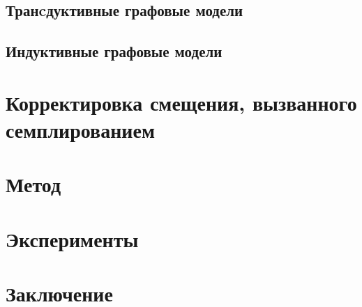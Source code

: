 \documentclass{article}
\begin{document}
\subsection{Транcдуктивные графовые модели}

\subsection{Индуктивные графовые модели}

\section{Корректировка смещения, вызванного семплированием}

\section{Метод}

\section{Эксперименты}

\section{Заключение}



\end{document}
